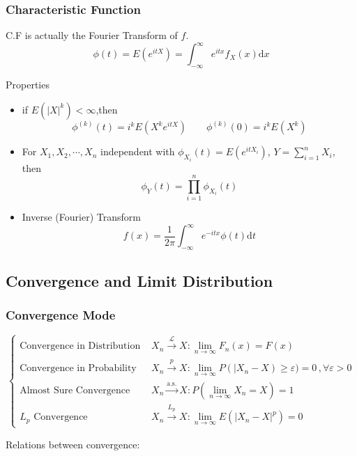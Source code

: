 \subsubsection{Characteristic Function}
    C.F is actually the Fourier Transform of $f$.
    \[
        \phi(t)=E(e^{itX}) = \int_{-\infty}^\infty e^{itx}f_X(x)\mathrm{d}x
    \]

    Properties
    \begin{itemize}
    \item if $E(|X|^k)<\infty$,then
    \[
        \phi^{(k)}(t)=i^kE(X^ke^{itX})\qquad \phi^{(k)}(0)=i^kE(X^k)    
    \]
    \item For $X_1,X_2,\cdots,X_n$ independent with $\phi_{X_i}(t)=E(e^{itX_i})$, $Y={\displaystyle \sum_{i=1}^n} X_i$, then
    \[
        \phi_Y(t)=\prod_{i=1}^n \phi_{X_i}(t)
    \]
    \item Inverse (Fourier) Transform
    \[
        f(x)=\frac{1}{2\pi}\int_{-\infty}^\infty e^{-itx}\phi(t)\mathrm{d}t    
    \]
\end{itemize}



\subsection{Convergence and Limit Distribution}
\subsubsection{Convergence Mode}
    \[
        \begin{cases}
            \text{Convergence in Distribution }&{\displaystyle X_n\xrightarrow[]{\mathscr{L}}X:\lim_{n\to\infty}F_n(x)=F(x)}\\
            \text{Convergence in Probability }&{\displaystyle X_n\xrightarrow[]{p}X:\lim_{n\to\infty}P(|X_n-X)\geq\varepsilon)=0\, ,\forall\varepsilon>0}\\
            \text{Almost Sure Convergence }&{\displaystyle X_n\xrightarrow[]{\text{a.s.}}X:P(\lim_{n\to\infty}X_n=X)=1}\\
            L_p\text{ Convergence }&{\displaystyle X_n\xrightarrow[]{L_p}X:\lim_{n\to\infty}E(|X_n-X|^p)=0}
        \end{cases}
    \]

        Relations between convergence:
        \begin{center}
        \end{center}

